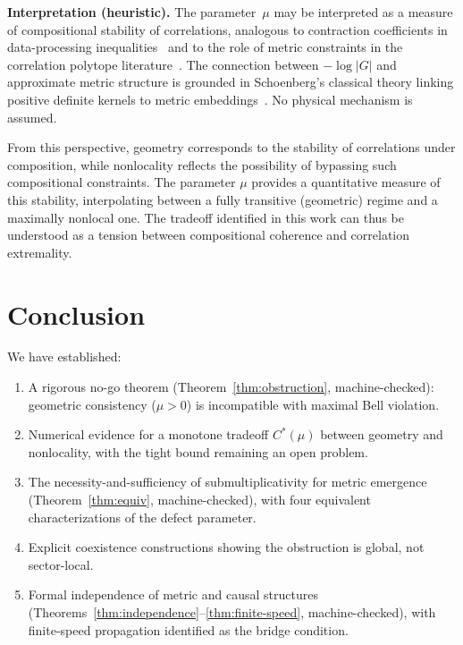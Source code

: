 \documentclass[11pt,a4paper]{article}
\theoremstyle{definition}
\theoremstyle{remark}
\begin{document}
\medskip\noindent\textbf{Interpretation (heuristic).}\quad
The parameter~$\mu$ may be interpreted as a measure of compositional stability of correlations, analogous to contraction coefficients in data-processing inequalities~\cite{kondor2002} and to the role of metric constraints in the correlation polytope literature~\cite{avis2006,fine1982}. The connection between $-\log|G|$ and approximate metric structure is grounded in Schoenberg's classical theory linking positive definite kernels to metric embeddings~\cite{schoenberg1938,berg1984}. No physical mechanism is assumed.

From this perspective, geometry corresponds to the stability of correlations under composition, while nonlocality reflects the possibility of bypassing such compositional constraints. The parameter $\mu$ provides a quantitative measure of this stability, interpolating between a fully transitive (geometric) regime and a maximally nonlocal one. The tradeoff identified in this work can thus be understood as a tension between compositional coherence and correlation extremality.


\section{Conclusion}\label{sec:conclusion}

We have established:
\begin{enumerate}[nosep]
  \item A rigorous no-go theorem (Theorem~\ref{thm:obstruction}, machine-checked): geometric consistency ($\mu > 0$) is incompatible with maximal Bell violation.
  \item Numerical evidence for a monotone tradeoff $C^*(\mu)$ between geometry and nonlocality, with the tight bound remaining an open problem.
  \item The necessity-and-sufficiency of submultiplicativity for metric emergence (Theorem~\ref{thm:equiv}, machine-checked), with four equivalent characterizations of the defect parameter.
  \item Explicit coexistence constructions showing the obstruction is global, not sector-local.
  \item Formal independence of metric and causal structures (Theorems~\ref{thm:independence}--\ref{thm:finite-speed}, machine-checked), with finite-speed propagation identified as the bridge condition.
\end{enumerate}
\end{document}
